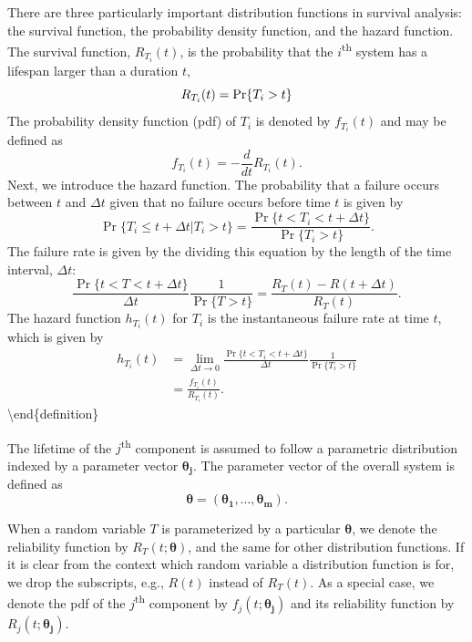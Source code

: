 \documentclass[
]{article}
\begin{document}
There are three particularly important distribution functions in
survival analysis: the survival function, the probability density
function, and the hazard function. The survival function,
\(R_{T_i}(t)\), is the probability that the \(i\)\textsuperscript{th}
system has a lifespan larger than a duration \(t\), \begin{equation}
R_{T_i}(t) = \Pr\{T_i > t\}\\
\end{equation} The probability density function (pdf) of \(T_i\) is
denoted by \(f_{T_i}(t)\) and may be defined as \[
    f_{T_i}(t) = -\frac{d}{dt} R_{T_i}(t).
\] Next, we introduce the hazard function. The probability that a
failure occurs between \(t\) and \(\Delta t\) given that no failure
occurs before time \(t\) is given by \[
\Pr\{T_i \leq t+\Delta t|T_i > t\} = \frac{\Pr\{t < T_i < t+\Delta t\}}{\Pr\{T_i > t\}}.
\] The failure rate is given by the dividing this equation by the length
of the time interval, \(\Delta t\): \[
\frac{\Pr\{t < T < t+\Delta t\}}{\Delta t} \frac{1}{\Pr\{T > t\}} =
    \frac{R_T(t) - R(t+\Delta t)}{R_T(t)}.
\] The hazard function \(h_{T_i}(t)\) for \(T_i\) is the instantaneous
failure rate at time \(t\), which is given by \begin{equation}
\label{eq:failure_rate}
\begin{split}
h_{T_i}(t) &= \lim_{\Delta t \to 0} \frac{\Pr\{t < T_i < t+\Delta t\}}{\Delta t} \frac{1}{\Pr\{T_i > t\}}\\
       &= \frac{f_{T_i}(t)}{R_{T_i}(t)}.
\end{split}
\end{equation} \textbackslash end\{definition\}

The lifetime of the \(j\)\textsuperscript{th} component is assumed to
follow a parametric distribution indexed by a parameter vector
\(\boldsymbol{\theta_j}\). The parameter vector of the overall system is
defined as \[
    \boldsymbol{\theta }= (\boldsymbol{\theta_1},\ldots,\boldsymbol{\theta_m}).
\]

When a random variable \(T\) is parameterized by a particular
\(\boldsymbol{\theta}\), we denote the reliability function by
\(R_T(t;\boldsymbol{\theta})\), and the same for other distribution
functions. If it is clear from the context which random variable a
distribution function is for, we drop the subscripts, e.g., \(R(t)\)
instead of \(R_T(t)\). As a special case, we denote the pdf of the
\(j\)\textsuperscript{th} component by \(f_j(t;\boldsymbol{\theta_j})\)
and its reliability function by \(R_j(t;\boldsymbol{\theta_j})\).
\end{document}
